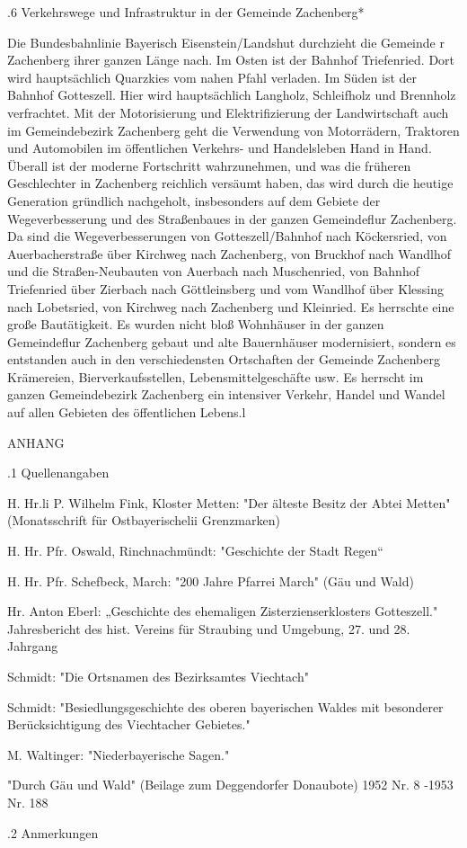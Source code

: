 .6 Verkehrswege und Infrastruktur in der Gemeinde Zachenberg*

Die Bundesbahnlinie Bayerisch Eisenstein/Landshut durchzieht die Gemeinde r
Zachenberg ihrer ganzen Länge nach. Im Osten ist der Bahnhof Triefenried. Dort
wird hauptsächlich Quarzkies vom nahen Pfahl verladen. Im Süden ist der Bahnhof
Gotteszell. Hier wird hauptsächlich Langholz, Schleifholz und Brennholz
verfrachtet. Mit der Motorisierung und Elektrifizierung der Landwirtschaft auch
im Gemeindebezirk Zachenberg geht die Verwendung von Motorrädern, Traktoren und
Automobilen im öffentlichen Verkehrs- und Handelsleben Hand in Hand. Überall ist
der moderne Fortschritt wahrzunehmen, und was die früheren Geschlechter in
Zachenberg reichlich versäumt haben, das wird durch die heutige Generation
gründlich nachgeholt, insbesonders auf dem Gebiete der Wegeverbesserung und des
Straßenbaues in der ganzen Gemeindeflur Zachenberg. Da sind die
Wegeverbesserungen von Gotteszell/Bahnhof nach Köckersried, von Auerbacherstraße
über Kirchweg nach Zachenberg, von Bruckhof nach Wandlhof und die
Straßen-Neubauten von Auerbach nach Muschenried, von Bahnhof Triefenried über
Zierbach nach Göttleinsberg und vom Wandlhof über Klessing nach Lobetsried, von
Kirchweg nach Zachenberg und Kleinried. Es herrschte eine große Bautätigkeit. Es
wurden nicht bloß Wohnhäuser in der ganzen Gemeindeflur Zachenberg gebaut und
alte Bauernhäuser modernisiert, sondern es entstanden auch in den
verschiedensten Ortschaften der Gemeinde Zachenberg Krämereien,
Bierverkaufsstellen, Lebensmittelgeschäfte usw. Es herrscht im ganzen
Gemeindebezirk Zachenberg ein intensiver Verkehr, Handel und Wandel auf allen
Gebieten des öffentlichen Lebens.l

ANHANG

.1 Quellenangaben

H. Hr.li P. Wilhelm Fink, Kloster Metten: "Der älteste Besitz der Abtei Metten"
(Monatsschrift für Ostbayerischelii Grenzmarken)

H. Hr. Pfr. Oswald, Rinchnachmündt: "Geschichte der Stadt Regen“

H. Hr. Pfr. Schefbeck, March: "200 Jahre Pfarrei March" (Gäu und Wald)

Hr. Anton Eberl: „Geschichte des ehemaligen Zisterzienserklosters Gotteszell."
Jahresbericht des hist. Vereins für Straubing und Umgebung, 27. und 28. Jahrgang

Schmidt: "Die Ortsnamen des Bezirksamtes Viechtach"

Schmidt: "Besiedlungsgeschichte des oberen bayerischen Waldes mit besonderer
Berücksichtigung des Viechtacher Gebietes."

M. Waltinger: "Niederbayerische Sagen."

"Durch Gäu und Wald" (Beilage zum Deggendorfer Donaubote) 1952 Nr. 8 -1953 Nr.
188

.2 Anmerkungen













